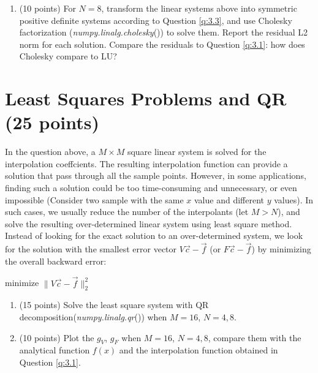 \documentclass[10pt]{article}
\begin{document}
\begin{enumerate}[label=3.\arabic*]
    \item (10 points)
    For $N = 8$, transform the linear systems above into symmetric positive definite systems according to Question \ref{q:3.3}, and use Cholesky factorization (\textit{numpy.linalg.cholesky}()) to solve them. Report the residual L2 norm for each solution. Compare the residuals to Question \ref{q:3.1}: how does Cholesky compare to LU?


\end{enumerate}


\section{Least Squares Problems and QR (25 points)}\label{sec:lin_lsp}

In the question above, a $M\times M$ square linear system is solved for the interpolation coeffcients.
The resulting interpolation function can provide a solution that pass through all the sample points.
However, in some applications, finding such a solution could be too time-consuming and unnecessary, or even impossible (Consider two sample with the same $x$ value and different $y$ values).
In such cases, we usually reduce the number of the interpolants (let $M>N$), and solve the resulting over-determined linear system using least square method.
Instead of looking for the exact solution to an over-determined system, we look for the solution with the smallest error vector $V\vec{c}-\vec{f}$ (or $F\vec{c}-\vec{f}$) by minimizing the overall backward error:

\begin{center}
minimize $\|V \vec{c}-\vec{f}\|_{2}^{2}$
\end{center}

\begin{enumerate}[label=4.\arabic*]
    \item (15 points)
    Solve the least square system with QR decomposition(\textit{numpy.linalg.qr}()) when $M=16$, $N=4,8$.
    \item (10 points)
    Plot the $g_V$, $g_F$ when $M=16$, $N=4,8$, compare them with the analytical function $f(x)$ and the interpolation function obtained in Question \ref{q:3.1}.
\end{enumerate}
\end{document}
